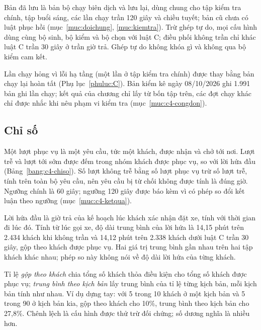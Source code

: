Bản đã lưu là bản bộ chạy biên dịch và lưu lại, dùng chung cho tập kiểm tra chính, tập buổi sáng, các lần chạy trần
120 giây và chiều tuyết; bản cũ chưa có luật phục hồi (mục~\ref{muc:doichung}, \ref{muc:kiemtra}). Trừ ghép tự do, mọi
cấu hình dùng cùng bộ sinh, bộ kiểm và bộ chọn với luật C; điều phối không trần chỉ khác luật C trần 30 giây ở trần giờ
trả. Ghép tự do không khóa gì và không qua bộ kiểm cam kết.

Lần chạy hỏng vì lỗi hạ tầng (một lần ở tập kiểm tra chính) được thay bằng bản chạy lại hoàn tất (Phụ
lục~\ref{phuluc:C}). Bản kiểm kê ngày 08/10/2026 ghi 1.991 bản ghi lần chạy; kết quả của chương chỉ lấy từ bốn tập
trên, các đợt chạy khác chỉ được nhắc khi nêu phạm vi kiểm tra (mục~\ref{muc:c4-congdon}).

\subsection{Chỉ số}
\label{muc:c4-chiso}

Một lượt phục vụ là một yêu cầu, tức một khách, được nhận và chở tới nơi. Lượt trễ và lượt tới sớm được đếm trong nhóm
khách được phục vụ, so với lời hứa đầu (Bảng~\ref{bang:c4-chiso}). Số lượt không trễ bằng số lượt phục vụ trừ số lượt
trễ, tính trên toàn bộ yêu cầu, nên yêu cầu bị từ chối không được tính là đúng giờ. Ngưỡng chính là 60 giây; ngưỡng
120 giây được báo kèm vì có phép so đổi kết luận theo ngưỡng (mục~\ref{muc:c4-ketqua}).

Lời hứa đầu là giờ trả của kế hoạch lúc khách xác nhận đặt xe, tính với thời gian đi lúc đó. Tính từ lúc gọi xe, độ dài
trung bình của lời hứa là 14,15 phút trên 2.434 khách khi không trần và 14,12 phút trên 2.338 khách dưới luật C trần 30
giây, gộp theo khách được phục vụ. Hai giá trị trung bình gần nhau trên hai tập khách khác nhau; phép so này không nói
về độ dài lời hứa của từng khách.

Tỉ lệ \emph{gộp theo khách} chia tổng số khách thỏa điều kiện cho tổng số khách được phục vụ; \emph{trung bình theo
kịch bản} lấy trung bình của tỉ lệ từng kịch bản, mỗi kịch bản tính như nhau. Ví dụ dựng tay: với 5 trong 10 khách ở
một kịch bản và 5 trong 90 ở kịch bản kia, gộp theo khách cho 10\%, trung bình theo kịch bản cho 27,8\%. Chênh lệch là
cấu hình được thử trừ đối chứng; số dương nghĩa là nhiều hơn.

